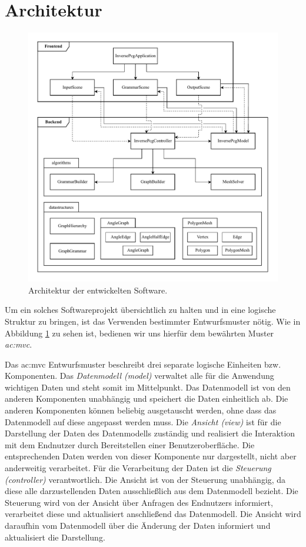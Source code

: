 \section{Architektur}
\label{chap:architektur}

\begin{figure}[h]
    \centering
    \includegraphics[width=\textwidth]{images/architecture.pdf}
    \caption{Architektur der entwickelten Software.}
    \label{fig:architecture}
\end{figure}

Um ein solches Softwareprojekt übersichtlich zu halten und in eine logische Struktur zu bringen, ist das Verwenden bestimmter Entwurfsmuster nötig.
Wie in Abbildung \ref{fig:architecture} zu sehen ist, bedienen wir uns hierfür dem bewährten Muster \textit{\gls{ac:mvc}}.

Das \gls{ac:mvc} Entwurfsmuster beschreibt drei separate logische Einheiten bzw. Komponenten. Das \textit{Datenmodell (model)} verwaltet alle für
die Anwendung wichtigen Daten und steht somit im Mittelpunkt. Das Datenmodell ist von den anderen Komponenten unabhängig und speichert die Daten einheitlich
ab. Die anderen Komponenten können beliebig ausgetauscht werden, ohne dass das Datenmodell auf diese angepasst werden muss. Die \textit{Ansicht (view)}
ist für die Darstellung der Daten des Datenmodells zuständig und realisiert die Interaktion mit dem Endnutzer durch Bereitstellen einer Benutzeroberfläche.
Die entsprechenden Daten werden von dieser Komponente nur dargestellt, nicht aber anderweitig verarbeitet. Für die Verarbeitung der Daten ist die
\textit{Steuerung (controller)} verantwortlich. Die Ansicht ist von der Steuerung unabhängig, da diese alle darzustellenden Daten ausschließlich aus
dem Datenmodell bezieht. Die Steuerung wird von der Ansicht über Anfragen des Endnutzers informiert, verarbeitet diese und aktualisiert anschließend das
Datenmodell. Die Ansicht wird daraufhin vom Datenmodell über die Änderung der Daten informiert und aktualisiert die Darstellung. \cite{48_bucanek}

